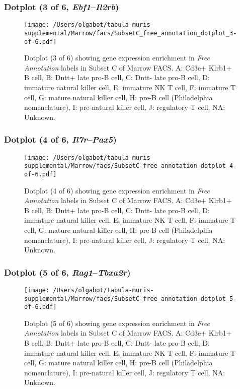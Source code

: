 \clearpage

\subsubsection{Dotplot (3 of 6, \emph{Ebf1}--\emph{Il2rb})}
\begin{figure}[h]
\centering
\texttt{[image: /Users/olgabot/tabula-muris-supplemental/Marrow/facs/SubsetC\_free\_annotation\_dotplot\_3-of-6.pdf]}

\caption{ Dotplot (3 of 6)  showing gene expression enrichment in \emph{Free Annotation} labels in Subset C of Marrow FACS. A: Cd3e+ Klrb1+ B cell, B: Dntt+ late pro-B cell, C: Dntt- late pro-B cell, D: immature natural killer cell, E: immature NK T cell, F: immature T cell, G: mature natural killer cell, H: pre-B cell (Philadelphia nomenclature), I: pre-natural killer cell, J: regulatory T cell, NA: Unknown.}
\end{figure}


\clearpage

\subsubsection{Dotplot (4 of 6, \emph{Il7r}--\emph{Pax5})}
\begin{figure}[h]
\centering
\texttt{[image: /Users/olgabot/tabula-muris-supplemental/Marrow/facs/SubsetC\_free\_annotation\_dotplot\_4-of-6.pdf]}

\caption{ Dotplot (4 of 6)  showing gene expression enrichment in \emph{Free Annotation} labels in Subset C of Marrow FACS. A: Cd3e+ Klrb1+ B cell, B: Dntt+ late pro-B cell, C: Dntt- late pro-B cell, D: immature natural killer cell, E: immature NK T cell, F: immature T cell, G: mature natural killer cell, H: pre-B cell (Philadelphia nomenclature), I: pre-natural killer cell, J: regulatory T cell, NA: Unknown.}
\end{figure}


\clearpage

\subsubsection{Dotplot (5 of 6, \emph{Rag1}--\emph{Tbxa2r})}
\begin{figure}[h]
\centering
\texttt{[image: /Users/olgabot/tabula-muris-supplemental/Marrow/facs/SubsetC\_free\_annotation\_dotplot\_5-of-6.pdf]}

\caption{ Dotplot (5 of 6)  showing gene expression enrichment in \emph{Free Annotation} labels in Subset C of Marrow FACS. A: Cd3e+ Klrb1+ B cell, B: Dntt+ late pro-B cell, C: Dntt- late pro-B cell, D: immature natural killer cell, E: immature NK T cell, F: immature T cell, G: mature natural killer cell, H: pre-B cell (Philadelphia nomenclature), I: pre-natural killer cell, J: regulatory T cell, NA: Unknown.}
\end{figure}


